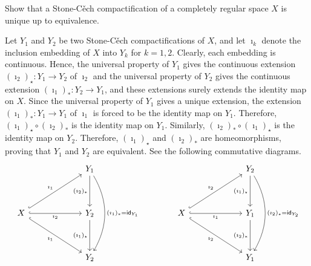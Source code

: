 \begin{prob}
    Show that a Stone-C\v{e}ch compactification of a completely regular space $X$ is unique up to equivalence.
\end{prob}
\begin{sol}
    Let $Y_1$ and $Y_2$ be two Stone-C\v{e}ch compactifications of $X$, and let $\imath_k$ denote the inclusion embedding of $X$ into $Y_k$ for $k=1, 2$.
    Clearly, each embedding is continuous.
    Hence, the universal property of $Y_1$ gives the continuous extension $(\imath_2)_\star: Y_1\rightarrow Y_2$ of $\imath_2$ and the universal property of $Y_2$ gives the continuous extension $(\imath_1)_*: Y_2\rightarrow Y_1$, and these extensions surely extends the identity map on $X$.
    Since the universal property of $Y_1$ gives a unique extension, the extension $(\imath_1)_*: Y_1\rightarrow Y_1$ of $\imath_1$ is forced to be the identity map on $Y_1$.
    Therefore, $(\imath_1)_\star\circ(\imath_2)_*$ is the identity map on $Y_1$.
    Similarly, $(\imath_2)_*\circ(\imath_1)_\star$ is the identity map on $Y_2$.
    Therefore, $(\imath_1)_\star$ and $(\imath_2)_*$ are homeomorphisms, proving that $Y_1$ and $Y_2$ are equivalent.
    See the following commutative diagrams.
    \begin{equation*}
    \begin{tikzcd}[row sep=1.3cm, column sep=2.2cm]
        & Y_1\arrow[d, "(\imath_2)_*"']\arrow[dd, bend left, "(\imath_1)_*=\textsf{id}_{Y_1}"]\\
        X
        \arrow[ur, "\imath_1", hook]
        \arrow[r, "\imath_2"', hook]
        \arrow[dr, "\imath_1"', hook]
        & Y_2\arrow[d, "(\imath_1)_\star"']\\
        & Y_2
    \end{tikzcd}
    \qquad\qquad
    \begin{tikzcd}[row sep=1.3cm, column sep=2.2cm]
        & Y_2\arrow[d, "(\imath_1)_\star"']\arrow[dd, bend left, "(\imath_2)_\star=\textsf{id}_{Y_2}"]\\
        X
        \arrow[ur, "\imath_2", hook]
        \arrow[r, "\imath_1"', hook]
        \arrow[dr, "\imath_2"', hook]
        & Y_1\arrow[d, "(\imath_2)_*"']\\
        & Y_1
    \end{tikzcd}
    \end{equation*}
\end{sol}